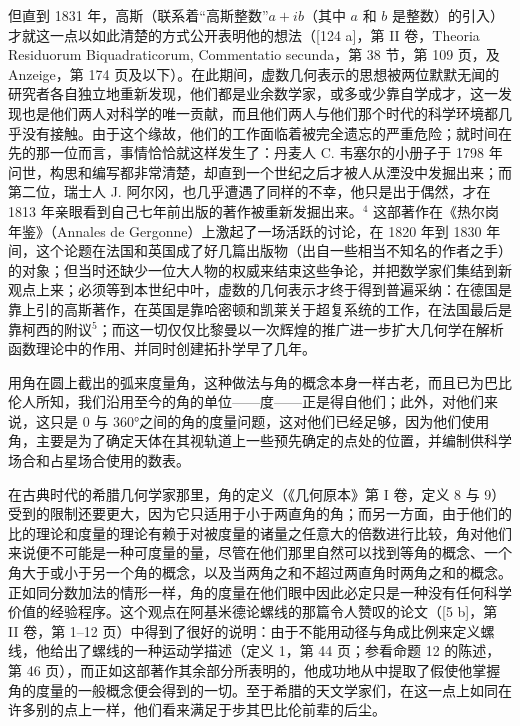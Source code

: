 但直到 1831 年，高斯（联系着“高斯整数”\(a + ib\)（其中 \(a\) 和 \(b\) 是整数）的引入）才就这一点以如此清楚的方式公开表明他的想法（{[}124 a{]}，第 II 卷，Theoria Residuorum Biquadraticorum, Commentatio secunda，第 38 节，第 109 页，及 Anzeige，第 174 页及以下）。在此期间，虚数几何表示的思想被两位默默无闻的研究者各自独立地重新发现，他们都是业余数学家，或多或少靠自学成才，这一发现也是他们两人对科学的唯一贡献，而且他们两人与他们那个时代的科学环境都几乎没有接触。由于这个缘故，他们的工作面临着被完全遗忘的严重危险；就时间在先的那一位而言，事情恰恰就这样发生了：丹麦人 C. 韦塞尔的小册子于 1798 年问世，构思和编写都非常清楚，却直到一个世纪之后才被人从湮没中发掘出来；而第二位，瑞士人 J. 阿尔冈，也几乎遭遇了同样的不幸，他只是出于偶然，才在 1813 年亲眼看到自己七年前出版的著作被重新发掘出来。\(^{4}\) 这部著作在《热尔岗年鉴》（Annales de Gergonne）上激起了一场活跃的讨论，在 1820 年到 1830 年间，这个论题在法国和英国成了好几篇出版物（出自一些相当不知名的作者之手）的对象；但当时还缺少一位大人物的权威来结束这些争论，并把数学家们集结到新观点上来；必须等到本世纪中叶，虚数的几何表示才终于得到普遍采纳：在德国是靠上引的高斯著作，在英国是靠哈密顿和凯莱关于超复系统的工作，在法国最后是靠柯西的附议\(^{5}\)；而这一切仅仅比黎曼以一次辉煌的推广进一步扩大几何学在解析函数理论中的作用、并同时创建拓扑学早了几年。

用角在圆上截出的弧来度量角，这种做法与角的概念本身一样古老，而且已为巴比伦人所知，我们沿用至今的角的单位——度——正是得自他们；此外，对他们来说，这只是 0 与 360°之间的角的度量问题，这对他们已经足够，因为他们使用角，主要是为了确定天体在其视轨道上一些预先确定的点处的位置，并编制供科学场合和占星场合使用的数表。

在古典时代的希腊几何学家那里，角的定义（《几何原本》第 I 卷，定义 8 与 9）受到的限制还要更大，因为它只适用于小于两直角的角；而另一方面，由于他们的比的理论和度量的理论有赖于对被度量的诸量之任意大的倍数进行比较，角对他们来说便不可能是一种可度量的量，尽管在他们那里自然可以找到等角的概念、一个角大于或小于另一个角的概念，以及当两角之和不超过两直角时两角之和的概念。正如同分数加法的情形一样，角的度量在他们眼中因此必定只是一种没有任何科学价值的经验程序。这个观点在阿基米德论螺线的那篇令人赞叹的论文（{[}5 b{]}，第 II 卷，第 1–12 页）中得到了很好的说明：由于不能用动径与角成比例来定义螺线，他给出了螺线的一种运动学描述（定义 1，第 44 页；参看命题 12 的陈述，第 46 页），而正如这部著作其余部分所表明的，他成功地从中提取了假使他掌握角的度量的一般概念便会得到的一切。至于希腊的天文学家们，在这一点上如同在许多别的点上一样，他们看来满足于步其巴比伦前辈的后尘。

